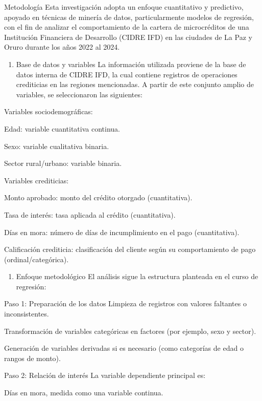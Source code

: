 \documentclass[Royal,times,sageh]{sagej}
\providecommand{\tightlist}{%
  \setlength{\itemsep}{0pt}\setlength{\parskip}{0pt}}
\begin{document}
Metodología Esta investigación adopta un enfoque cuantitativo y
predictivo, apoyado en técnicas de minería de datos, particularmente
modelos de regresión, con el fin de analizar el comportamiento de la
cartera de microcréditos de una Institución Financiera de Desarrollo
(CIDRE IFD) en las ciudades de La Paz y Oruro durante los años 2022 al
2024.

\begin{enumerate}
\def\labelenumi{\arabic{enumi}.}
\tightlist
\item
  Base de datos y variables La información utilizada proviene de la base
  de datos interna de CIDRE IFD, la cual contiene registros de
  operaciones crediticias en las regiones mencionadas. A partir de este
  conjunto amplio de variables, se seleccionaron las siguientes:
\end{enumerate}

Variables sociodemográficas:

Edad: variable cuantitativa continua.

Sexo: variable cualitativa binaria.

Sector rural/urbano: variable binaria.

Variables crediticias:

Monto aprobado: monto del crédito otorgado (cuantitativa).

Tasa de interés: tasa aplicada al crédito (cuantitativa).

Días en mora: número de días de incumplimiento en el pago
(cuantitativa).

Calificación crediticia: clasificación del cliente según su
comportamiento de pago (ordinal/categórica).

\begin{enumerate}
\def\labelenumi{\arabic{enumi}.}
\setcounter{enumi}{1}
\tightlist
\item
  Enfoque metodológico El análisis sigue la estructura planteada en el
  curso de regresión:
\end{enumerate}

Paso 1: Preparación de los datos Limpieza de registros con valores
faltantes o inconsistentes.

Transformación de variables categóricas en factores (por ejemplo, sexo y
sector).

Generación de variables derivadas si es necesario (como categorías de
edad o rangos de monto).

Paso 2: Relación de interés La variable dependiente principal es:

Días en mora, medida como una variable continua.
\end{document}
